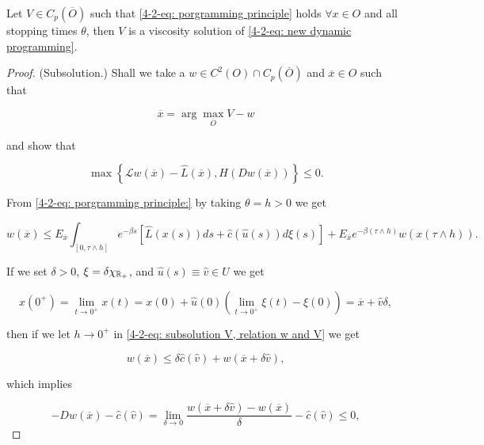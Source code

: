 \begin{theorem}
    Let $V\in C_p(\overline{O})$ such that \eqref{4-2-eq: porgramming principle} holds $\forall x\in O$ and all stopping times $\theta$, then $V$ is a viscosity solution of \eqref{4-2-eq: new dynamic programming}.

    \begin{proof}
        (Subsolution.) Shall we take a $w\in C^2(O)\cap C_p(\overline{O})$ and $\overline{x}\in O$ such that
        
        \[\overline{x} = \arg \max_{\overline{O}} V-w\]

        and show that 

        \begin{equation}\label{4-2-eq: subsol prop}
            \max\left\{\mathcal{L}w(\overline{x}) - \hat{L}(\overline{x}), H(Dw(\overline{x}))\right\} \leq 0.
        \end{equation}

        From \eqref{4-2-eq: porgramming principle:} by taking $\theta = h>0$ we get

        \begin{equation}\label{4-2-eq: subsolution V, relation w and V}
            w(\overline{x}) \leq E_{\overline{x}} \int_{[0,\tau\land h]} e^{-\beta s}\left[\hat{L}(x(s))ds + \hat{c}(\hat{u}(s))d\xi(s)\right]+E_{\overline{x}}e^{-\beta(\tau\land h)}w(x(\tau\land h)).
        \end{equation}

        If we set $\delta>0$, $\xi=\delta\chi_{\mathbb{R}_+}$, and $\hat{u}(s)\equiv \hat{v}\in U$ we get

        \[x(0^+)=\lim_{t\to 0^+}x(t) = x(0) + \hat{u}(0)(\lim_{t\to 0^+}\xi(t)-\xi(0))=\overline{x}+\hat{v}\delta,\]

        then if we let $h\to0^+$ in \eqref{4-2-eq: subsolution V, relation w and V} we get

        \begin{equation}
            w(\overline{x}) \leq \delta\hat{c}(\hat{v}) + w(\overline{x} + \delta\hat{v}),
        \end{equation}

        which implies 

        \begin{equation}
            -Dw(\overline{x}) -\hat{c}(\hat{v}) = \lim_{\delta\to0} \frac{w(\overline{x} + \delta\hat{v}) - w(\overline{x})}{\delta} - \hat{c}(\hat{v}) \leq 0,
        \end{equation}


\end{proof}
\end{theorem}
